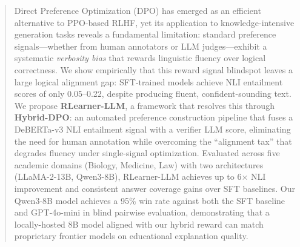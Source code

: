 \begin{abstract}
Direct Preference Optimization (DPO) has emerged as an efficient alternative to PPO-based RLHF, yet its application to knowledge-intensive generation tasks reveals a fundamental limitation: standard preference signals---whether from human annotators or LLM judges---exhibit a systematic \textit{verbosity bias} that rewards linguistic fluency over logical correctness. We show empirically that this reward signal blindspot leaves a large logical alignment gap: SFT-trained models achieve NLI entailment scores of only 0.05--0.22, despite producing fluent, confident-sounding text. We propose \textbf{RLearner-LLM}, a framework that resolves this through \textbf{Hybrid-DPO}: an automated preference construction pipeline that fuses a DeBERTa-v3 NLI entailment signal with a verifier LLM score, eliminating the need for human annotation while overcoming the ``alignment tax'' that degrades fluency under single-signal optimization. Evaluated across five academic domains (Biology, Medicine, Law) with two architectures (LLaMA-2-13B, Qwen3-8B), RLearner-LLM achieves up to 6$\times$ NLI improvement and consistent answer coverage gains over SFT baselines. Our Qwen3-8B model achieves a 95\% win rate against both the SFT baseline and GPT-4o-mini in blind pairwise evaluation, demonstrating that a locally-hosted 8B model aligned with our hybrid reward can match proprietary frontier models on educational explanation quality.
\end{abstract}
